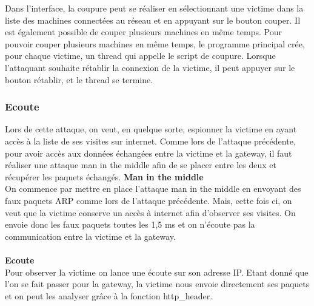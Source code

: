 \documentclass[11pt]{article}
\begin{document}
Dans l'interface, la coupure peut se réaliser en sélectionnant une victime dans la liste des machines connectées au réseau et en appuyant sur le bouton couper. Il est également possible de couper plusieurs machines en même temps. Pour pouvoir couper plusieurs machines en même temps, le programme principal crée, pour chaque victime, un thread qui appelle le script de coupure. Lorsque l'attaquant souhaite rétablir la connexion de la victime, il peut appuyer sur le bouton rétablir, et le thread se termine.

\subsubsection{Ecoute}
Lors de cette attaque, on veut, en quelque sorte, espionner la victime en ayant accès à la liste de ses visites sur internet. Comme lors de l'attaque précédente, pour avoir accès aux données échangées entre la victime et la gateway, il faut réaliser une attaque man in the middle afin de se placer entre les deux et récupérer les paquets échangés.
\textbf{Man in the middle}~\\

On commence par mettre en place l'attaque man in the middle en envoyant des faux paquets ARP comme lors de l'attaque précédente. Mais, cette fois ci, on veut que la victime conserve un accès à internet afin d'observer ses visites. On envoie donc les faux paquets toutes les 1,5 ms et on n'écoute pas la communication entre la victime et la gateway.~\\
~\\
\textbf{Ecoute}~\\

Pour observer la victime on lance une écoute sur son adresse IP. Etant donné que l'on se fait passer pour la gateway, la victime nous envoie directement ses paquets et on peut les analyser grâce à la fonction http\_header.~\\

\end{document}
